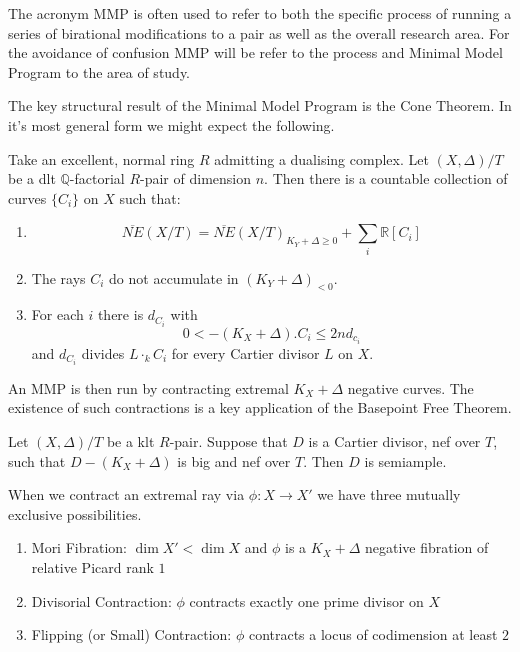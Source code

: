 \documentclass[a4paper,12pt]{book}
\begin{document}
The acronym MMP is often used to refer to both the specific process of running a series of birational modifications to a pair as well as the overall research area. For the avoidance of confusion MMP will be refer to the process and Minimal Model Program to the area of study.

The key structural result of the Minimal Model Program is the Cone Theorem. In it's most general form we might expect the following.

\begin{conjecture}\label{cone-conj}
	Take an excellent, normal ring $R$ admitting a dualising complex.
	Let $(X,\Delta)/T$ be a dlt $\mathbb{Q}$-factorial $R$-pair of dimension $n$. Then there is a countable collection of curves $\{C_{i}\}$ on $X$ such that:
	\begin{enumerate}
		\item $$\overline{NE}(X/T)=\overline{NE}(X/T)_{K_{Y}+\Delta \geq 0} + \sum_{i} \mathbb{R}[C_{i}]$$
		\item The rays $C_{i}$ do not accumulate in $(K_{Y}+\Delta)_{<0}$.
		\item For each $i$ there is $d_{C_{i}}$ with 
		\[0 < -(K_{X}+\Delta).C_{i} \leq 2nd_{c_{i}}\]
		and $d_{C_{i}}$ divides $L\cdot_{k}C_{i}$ for every Cartier divisor $L$ on $X$.
	\end{enumerate}
\end{conjecture}

An MMP is then run by contracting extremal $K_{X}+\Delta$ negative curves. The existence of such contractions is a key application of the Basepoint Free Theorem.

\begin{conjecture}\label{bpt-conj}
	Let $(X,\Delta)/T$ be a klt $R$-pair. Suppose that $D$ is a Cartier divisor, nef over $T$, such that $D-(K_{X}+\Delta)$ is big and nef over $T$. Then $D$ is semiample.
\end{conjecture}

When we contract an extremal ray via $\phi:X \to X'$ we have three mutually exclusive possibilities.

\begin{enumerate}
	\item Mori Fibration: $\dim X' < \dim X$ and $\phi$ is a $K_{X}+\Delta$ negative fibration of relative Picard rank $1$
	\item Divisorial Contraction: $\phi$ contracts exactly one prime divisor on $X$
	\item Flipping (or Small) Contraction: $\phi$ contracts a locus of codimension at least $2$
\end{enumerate}
\end{document}
